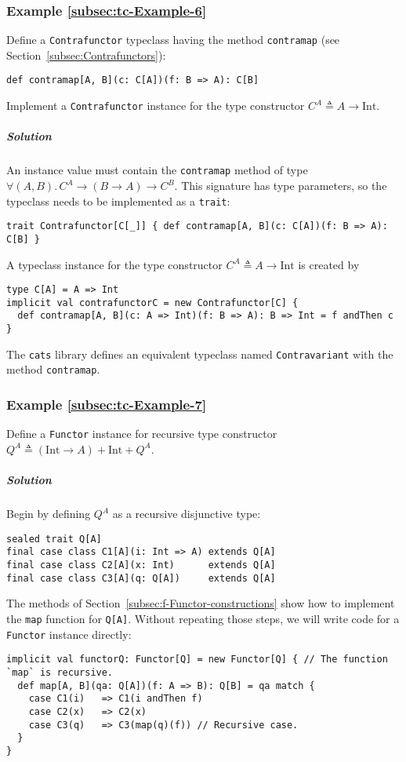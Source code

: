 \subsubsection{Example \label{subsec:tc-Example-6}\ref{subsec:tc-Example-6}}

Define a \lstinline!Contrafunctor! typeclass having the method \lstinline!contramap!
(see Section~\ref{subsec:Contrafunctors}):
\begin{lstlisting}
def contramap[A, B](c: C[A])(f: B => A): C[B]
\end{lstlisting}
Implement a \lstinline!Contrafunctor! instance for the type constructor
$C^{A}\triangleq A\rightarrow\text{Int}$.

\subparagraph{Solution}

An instance value must contain the \lstinline!contramap! method of
type $\forall(A,B).\,C^{A}\rightarrow(B\rightarrow A)\rightarrow C^{B}$.
This signature has type parameters, so the typeclass needs to be implemented
as a \lstinline!trait!:
\begin{lstlisting}
trait Contrafunctor[C[_]] { def contramap[A, B](c: C[A])(f: B => A): C[B] }
\end{lstlisting}
A typeclass instance for the type constructor $C^{A}\triangleq A\rightarrow\text{Int}$
is created by
\begin{lstlisting}
type C[A] = A => Int
implicit val contrafunctorC = new Contrafunctor[C] {
  def contramap[A, B](c: A => Int)(f: B => A): B => Int = f andThen c
}
\end{lstlisting}

The \texttt{cats} library defines an equivalent typeclass named \lstinline!Contravariant!
with the method \lstinline!contramap!.

\subsubsection{Example \label{subsec:tc-Example-7}\ref{subsec:tc-Example-7}}

Define a \lstinline!Functor! instance for recursive type constructor
$Q^{A}\triangleq\left(\text{Int}\rightarrow A\right)+\text{Int}+Q^{A}$.

\subparagraph{Solution}

Begin by defining $Q^{A}$ as a recursive disjunctive type:
\begin{lstlisting}
sealed trait Q[A]
final case class C1[A](i: Int => A) extends Q[A]
final case class C2[A](x: Int)      extends Q[A]
final case class C3[A](q: Q[A])     extends Q[A]
\end{lstlisting}
The methods of Section~\ref{subsec:f-Functor-constructions} show
how to implement the \lstinline!map! function for \lstinline!Q[A]!.
Without repeating those steps, we will write code for a \lstinline!Functor!
instance directly:
\begin{lstlisting}
implicit val functorQ: Functor[Q] = new Functor[Q] { // The function `map` is recursive.
  def map[A, B](qa: Q[A])(f: A => B): Q[B] = qa match {
    case C1(i)   => C1(i andThen f)
    case C2(x)   => C2(x)
    case C3(q)   => C3(map(q)(f)) // Recursive case.
  }
}
\end{lstlisting}


